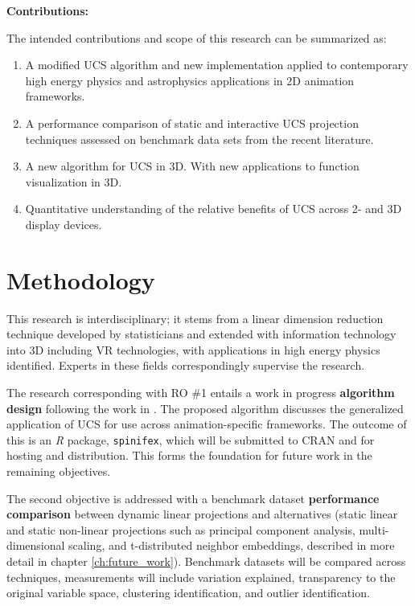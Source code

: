 \documentclass{monashthesis}
\begin{document}
\textbf{Contributions:}

The intended contributions and scope of this research can be summarized as:

\begin{enumerate}
\def\labelenumi{\arabic{enumi}.}
\tightlist
\item
  A modified UCS algorithm and new implementation applied to contemporary high energy physics and astrophysics applications in 2D animation frameworks.
\item
  A performance comparison of static and interactive UCS projection techniques assessed on benchmark data sets from the recent literature.
\item
  A new algorithm for UCS in 3D. With new applications to function visualization in 3D.
\item
  Quantitative understanding of the relative benefits of UCS across 2- and 3D display devices.
\end{enumerate}

\hypertarget{methodology}{%
\section{Methodology}\label{methodology}}

This research is interdisciplinary; it stems from a linear dimension reduction technique developed by statisticians and extended with information technology into 3D including VR technologies, with applications in high energy physics identified\autocite{cook_dynamical_2018}. Experts in these fields correspondingly supervise the research.

The research corresponding with RO \#1 entails a work in progress \textbf{algorithm design} following the work in \textcite{cook_manual_1997}. The proposed algorithm discusses the generalized application of UCS for use across animation-specific frameworks. The outcome of this is an \emph{R} package, \texttt{spinifex}, which will be submitted to CRAN and for hosting and distribution. This forms the foundation for future work in the remaining objectives.

The second objective is addressed with a benchmark dataset \textbf{performance comparison} between dynamic linear projections and alternatives (static linear and static non-linear projections such as principal component analysis, multi-dimensional scaling, and t-distributed neighbor embeddings, described in more detail in chapter \ref{ch:future_work}). Benchmark datasets will be compared across techniques, measurements will include variation explained, transparency to the original variable space, clustering identification, and outlier identification.
\end{document}
